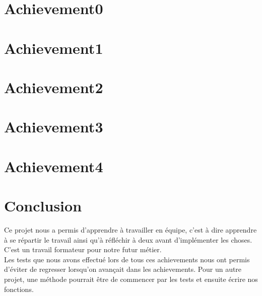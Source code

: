 \documentclass[11pt]{article}
\begin{document}
\section{Achievement0}

\newpage
\section{Achievement1}

\newpage
\section{Achievement2}

\newpage
\section{Achievement3}

\newpage
\section{Achievement4}

\newpage
\section{Conclusion}
Ce projet nous a permis d'apprendre à travailler en équipe, c'est à dire apprendre à se répartir le travail ainsi qu'à réfléchir à deux avant d'implémenter les choses. C'est un travail formateur pour notre futur métier.\\
Les tests que nous avons effectué lors de tous ces achievements nous ont permis d'éviter de regresser lorsqu'on avançait dans les achievements. Pour un autre projet, une méthode pourrait être de commencer par les tests et ensuite écrire nos fonctions.
\end{document}
